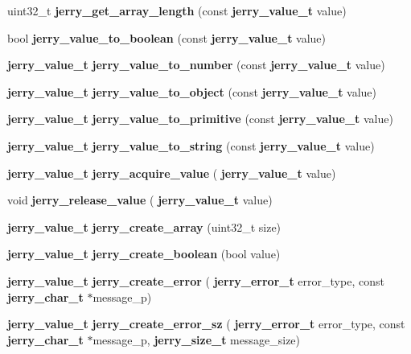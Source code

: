 \begin{DoxyCompactItemize}
\item 
uint32\+\_\+t \textbf{ jerry\+\_\+get\+\_\+array\+\_\+length} (const \textbf{ jerry\+\_\+value\+\_\+t} value)
\item 
bool \textbf{ jerry\+\_\+value\+\_\+to\+\_\+boolean} (const \textbf{ jerry\+\_\+value\+\_\+t} value)
\item 
\mbox{\label{group___core_ga4705d1e617d47c74faf0cd8b1bfc60ce}} 
\textbf{ jerry\+\_\+value\+\_\+t} {\bfseries jerry\+\_\+value\+\_\+to\+\_\+number} (const \textbf{ jerry\+\_\+value\+\_\+t} value)
\item 
\mbox{\label{group___core_ga7e52f62cec0c66eefc50d73728738480}} 
\textbf{ jerry\+\_\+value\+\_\+t} {\bfseries jerry\+\_\+value\+\_\+to\+\_\+object} (const \textbf{ jerry\+\_\+value\+\_\+t} value)
\item 
\mbox{\label{group___core_gaec678e7881c0f0dbe5ad8fb6f2457be6}} 
\textbf{ jerry\+\_\+value\+\_\+t} {\bfseries jerry\+\_\+value\+\_\+to\+\_\+primitive} (const \textbf{ jerry\+\_\+value\+\_\+t} value)
\item 
\mbox{\label{group___core_ga900e69413dbff48781cb4fecf8524f0e}} 
\textbf{ jerry\+\_\+value\+\_\+t} {\bfseries jerry\+\_\+value\+\_\+to\+\_\+string} (const \textbf{ jerry\+\_\+value\+\_\+t} value)
\item 
\textbf{ jerry\+\_\+value\+\_\+t} \textbf{ jerry\+\_\+acquire\+\_\+value} (\textbf{ jerry\+\_\+value\+\_\+t} value)
\item 
void \textbf{ jerry\+\_\+release\+\_\+value} (\textbf{ jerry\+\_\+value\+\_\+t} value)
\item 
\textbf{ jerry\+\_\+value\+\_\+t} \textbf{ jerry\+\_\+create\+\_\+array} (uint32\+\_\+t size)
\item 
\mbox{\label{group___core_ga049832b1adcaec9f5fc962119c9c9523}} 
\textbf{ jerry\+\_\+value\+\_\+t} {\bfseries jerry\+\_\+create\+\_\+boolean} (bool value)
\item 
\mbox{\label{group___core_ga58039f5f4abad6b0756e579ee0bcc9e6}} 
\textbf{ jerry\+\_\+value\+\_\+t} {\bfseries jerry\+\_\+create\+\_\+error} (\textbf{ jerry\+\_\+error\+\_\+t} error\+\_\+type, const \textbf{ jerry\+\_\+char\+\_\+t} $\ast$message\+\_\+p)
\item 
\mbox{\label{group___core_ga5c4f52d095150ef7977646c105ffcf36}} 
\textbf{ jerry\+\_\+value\+\_\+t} {\bfseries jerry\+\_\+create\+\_\+error\+\_\+sz} (\textbf{ jerry\+\_\+error\+\_\+t} error\+\_\+type, const \textbf{ jerry\+\_\+char\+\_\+t} $\ast$message\+\_\+p, \textbf{ jerry\+\_\+size\+\_\+t} message\+\_\+size)
\item 

\end{DoxyCompactItemize}

